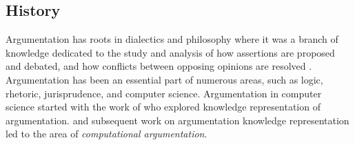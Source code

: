 % 

\subsection{History}

Argumentation has roots in dialectics and philosophy where it was a branch of
knowledge dedicated to the study and analysis of how assertions are proposed
and debated, and how conflicts between opposing opinions are resolved
\citep{bench2007argumentation}.  Argumentation has been an essential part of
numerous areas, such as logic, rhetoric, jurisprudence, and computer science. 
Argumentation in computer science started with 
the work of \citep{dung1995acceptability} who explored knowledge representation
of argumentation. \citet{dung1995acceptability} and subsequent work on argumentation
knowledge representation led to the area of \emph{computational argumentation}. 

